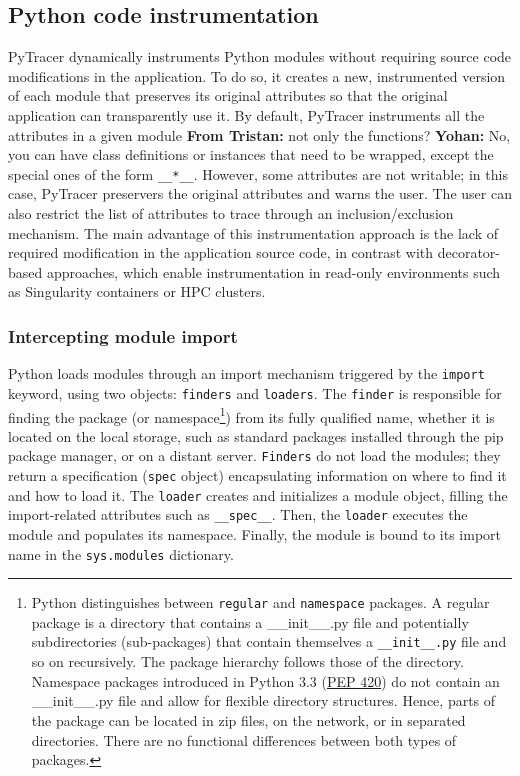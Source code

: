 \documentclass[11pt]{article}
\newcommand{\tristan}[1]{\color{orange}\textbf{From Tristan:} #1\color{black}\xspace}
\newcommand{\Yohan}[1]{\color{green!75!black}\textbf{Yohan:} #1\color{black}\xspace}
\newcommand{\pytracer}[0]{PyTracer\xspace}
\begin{document}
\subsection{Python code instrumentation}



\pytracer dynamically instruments Python modules
without requiring source code modifications in the application.
To do so, it creates a new, instrumented version of each module that preserves its original attributes so that the original application can transparently use it.
By default, \pytracer instruments all the attributes
in a given module \tristan{not only the functions?} \Yohan{No, you can have class definitions or instances that need to be wrapped}, except the special ones of the form \texttt{\_\_*\_\_}.
However, some attributes are not writable; in this case, \pytracer preservers the original attributes and warns the user. The user can also restrict the list of attributes to trace through
an inclusion/exclusion mechanism. The main advantage of this instrumentation approach is the lack of required modification in the application source code, in contrast with decorator-based approaches, which enable instrumentation in read-only environments such as Singularity containers or HPC clusters.


\subsubsection{Intercepting module import}

Python loads modules through an import mechanism triggered by the \texttt{import} keyword, using two objects: \texttt{finders} and \texttt{loaders}.
The \texttt{finder} is responsible for finding the package (or 
namespace\footnote{Python distinguishes between \texttt{regular} and \texttt{namespace} packages.
A regular package is a directory that contains a \_\_init\_\_.py file and potentially subdirectories (sub-packages) 
that contain themselves a \texttt{\_\_init\_\_.py} file and so on recursively. 
The package hierarchy follows those of the directory. 
Namespace packages introduced in Python 3.3 (\href{https://www.python.org/dev/peps/pep-0420/}{PEP 420}) do not contain an
\_\_init\_\_.py file and allow for flexible directory structures. Hence, parts of the package can be located in zip files, on the network, or in separated directories. There are no functional differences between both types of packages.}) from its fully qualified name, whether it is located on the local storage, such as standard packages installed through the pip package manager, or on a distant server.
\texttt{Finders} do not load the modules; they return a specification (\texttt{spec} object) encapsulating 
information on where to find it and how to load it.
The \texttt{loader} creates and initializes a module object, filling the import-related attributes 
such as \texttt{\_\_spec\_\_}. 
Then, the \texttt{loader} executes the module and populates its namespace. Finally, the module is bound to its import name in the \texttt{sys.modules} dictionary.
\end{document}

